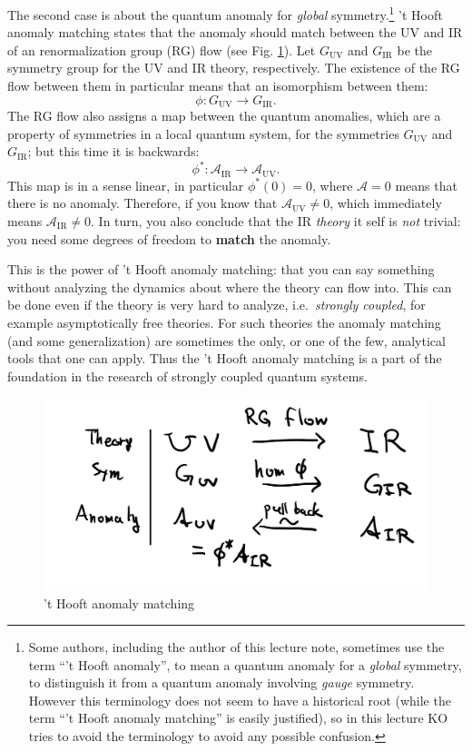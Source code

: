 \documentclass[
]{scrartcl}
\numberwithin{equation}{section}
\theoremstyle{definition}
\theoremstyle{definition}
\theoremstyle{definition}
\theoremstyle{definition}
\theoremstyle{remark}
\begin{document}
The second case is about the quantum anomaly for \emph{global} symmetry.\footnote{Some authors, including the author of this lecture note, sometimes use the term ``'t Hooft anomaly'', to mean a quantum anomaly for a \emph{global} symmetry, to distinguish it from a quantum anomaly involving \emph{gauge} symmetry. However this terminology does not seem to have a historical root (while the term ``'t Hooft anomaly matching'' is easily justified), so in this lecture KO tries to avoid the terminology to avoid any possible confusion.}
't Hooft anomaly matching states that the anomaly should match between the UV and IR of an renormalization group (RG) flow (see Fig. \ref{fig:flow}).
Let \(G_\text{UV}\) and \(G_\text{IR}\) be the symmetry group for the UV and IR theory, respectively.
The existence of the RG flow between them in particular means that an isomorphism between them:
\begin{equation}
  \label{eq:Ghom}
  \phi: G_\text{UV} \to G_\text{IR}.
\end{equation}
The RG flow also assigns a map between the quantum anomalies, which are a property of symmetries in a local quantum system, for the symmetries \(G_\text{UV}\) and \(G_\text{IR}\);
but this time it is backwards:
\begin{equation}
  \label{eq:pullback}
  \phi^*: \mathcal{A}_\text{IR} \to \mathcal{A}_\text{UV}.
\end{equation}
This map is in a sense linear, in particular \(\phi^* (0) = 0\), where \(\mathcal{A}=0\) means that there is no anomaly.
Therefore, if you know that \(\mathcal{A}_\text{UV}\neq 0\), which immediately means \(\mathcal{A}_\text{IR}\neq 0\).
In turn, you also conclude that the IR \emph{theory} it self is \emph{not} trivial: you need some degrees of freedom to \textbf{match} the anomaly.

This is the power of 't Hooft anomaly matching: that you can say something without analyzing the dynamics about where the theory can flow into.
This can be done even if the theory is very hard to analyze, i.e.~\emph{strongly coupled}, for example asymptotically free theories.
For such theories the anomaly matching (and some generalization) are sometimes the only, or one of the few, analytical tools that one can apply.
Thus the 't Hooft anomaly matching is a part of the foundation in the research of strongly coupled quantum systems.

\begin{figure}

{\centering \includegraphics[width=0.5\linewidth]{figs/flow_symmetry} 

}

\caption{'t Hooft anomaly matching}\label{fig:flow}
\end{figure}
\end{document}
